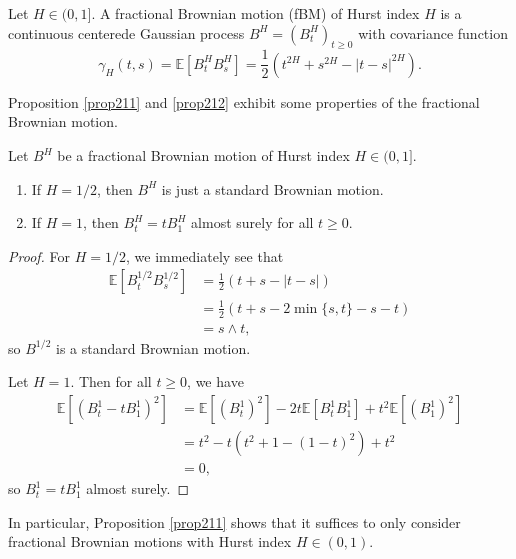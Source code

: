 \begin{defn}
    Let $H\in (0,1]$. A fractional Brownian motion (fBM) of Hurst index $H$ is a continuous centerede Gaussian process $B^{H}=(B_{t}^{H})_{t\geq 0}$ with covariance function
    \begin{equation}
        \gamma_{H}(t,s)=\mathbb{E}[B_{t}^{H}B_{s}^{H}]=\frac{1}{2}\left(t^{2H}+s^{2H}-|t-s|^{2H}\right).
    \end{equation}
\end{defn}
Proposition \ref{prop211} and \ref{prop212} exhibit some properties of the fractional Brownian motion.
\begin{prop}\label{prop211}
    Let $B^{H}$ be a fractional Brownian motion of Hurst index $H\in (0,1]$.
    \begin{enumerate}
        \item If $H=1/2$, then $B^{H}$ is just a standard Brownian motion.
        \item If $H=1$, then $B^{H}_{t}=tB_{1}^{H}$ almost surely for all $t\geq 0$.
    \end{enumerate}
\end{prop}
\begin{proof}
    For $H=1/2$, we immediately see that
    \begin{align}
        \mathbb{E}[B_{t}^{1/2}B_{s}^{1/2}]&=\frac{1}{2}\left(t+s-|t-s|\right)\\
        &= \frac{1}{2}\left(t+s-2 \min\{s,t\}-s-t\right)\\
        &= s\land t,
    \end{align}
    so $B^{1/2}$ is a standard Brownian motion.

    Let $H=1$. Then for all $t\geq 0$, we have
    \begin{align}
        \mathbb{E}\left[(B^{1}_{t}-tB_{1}^{1})^{2}\right]&= \mathbb{E}\left[(B_{t}^{1})^{2}\right]-2t\mathbb{E}\left[B_{t}^{1}B_{1}^{1}\right]+t^{2}\mathbb{E}\left[(B_{1}^{1})^{2}\right]\\
        &= t^{2}-t\left(t^{2}+1-(1-t)^{2}\right)+t^{2}\\
        &= 0,
    \end{align}
    so $B_{t}^{1}=tB_{1}^{1}$ almost surely.
\end{proof}
In particular, Proposition \ref{prop211} shows that it suffices to only consider fractional Brownian motions with Hurst index $H\in (0,1)$.
